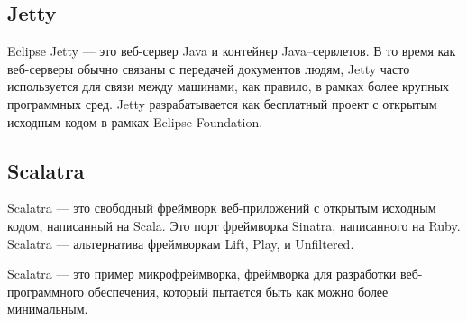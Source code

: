 
\subsection{Jetty}\label{sec:ch3/sect1/subsect4}

Eclipse Jetty --- это веб-сервер Java и контейнер Java--сервлетов. В то время как веб-серверы обычно связаны с передачей документов людям, Jetty часто используется для связи между машинами, как правило, в рамках более крупных программных сред. Jetty разрабатывается как бесплатный проект с открытым исходным кодом в рамках Eclipse Foundation. 

\subsection{Scalatra}\label{sec:ch3/sect1/subsect5}

Scalatra --- это свободный фреймворк веб-приложений с открытым исходным кодом, написанный на Scala. Это порт фреймворка Sinatra, написанного на Ruby. Scalatra --- альтернатива фреймворкам Lift, Play, и Unfiltered.

Scalatra --- это пример микрофреймворка, фреймворка для разработки веб-программного обеспечения, который пытается быть как можно более минимальным.




